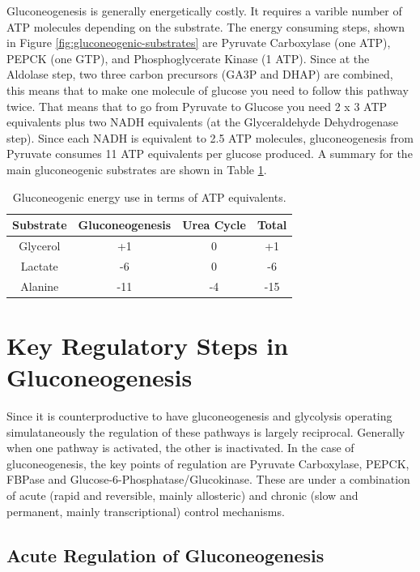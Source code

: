 \documentclass{tufte-handout}
\begin{document}
Gluconeogenesis is generally energetically costly.  It requires a varible number of ATP molecules depending on the substrate.  The energy consuming steps, shown in Figure \ref{fig:gluconeogenic-substrates} are Pyruvate Carboxylase (one ATP), PEPCK (one GTP), and Phosphoglycerate Kinase (1 ATP).  Since at the Aldolase step, two three carbon precursors (GA3P and DHAP) are combined, this means that to make one molecule of glucose you need to follow this pathway twice.  That means that to go from Pyruvate to Glucose you need 2 x 3 ATP equivalents plus two NADH equivalents (at the Glyceraldehyde Dehydrogenase step).  Since each NADH is equivalent to 2.5 ATP molecules, gluconeogenesis from Pyruvate consumes 11 ATP equivalents per glucose produced.  A summary for the main gluconeogenic substrates are shown in Table \ref{tab:gluconeogenesis-energetics}.

\begin{table}
\centering
\caption{Gluconeogenic energy use in terms of ATP equivalents.}
\label{tab:gluconeogenesis-energetics}
\begin{tabular}{cccc}
\hline
\textbf {Substrate} & \textbf{Gluconeogenesis}  & \textbf{Urea Cycle} & \textbf{Total}\\
\hline
Glycerol & +1 & 0 & +1\\
Lactate & -6 & 0 & -6 \\
Alanine & -11 & -4 & -15\\
\hline
\end{tabular}
\end{table}

\section{Key Regulatory Steps in Gluconeogenesis}

Since it is counterproductive to have gluconeogenesis and glycolysis operating simulataneously the regulation of these pathways is largely reciprocal.  Generally when one pathway is activated, the other is inactivated.  In the case of gluconeogenesis, the key points of regulation are Pyruvate Carboxylase, PEPCK, FBPase and Glucose-6-Phosphatase/Glucokinase.  These are under a combination of acute (rapid and reversible, mainly allosteric) and chronic (slow and permanent, mainly transcriptional) control mechanisms. 

\subsection{Acute Regulation of Gluconeogenesis}
\end{document}
